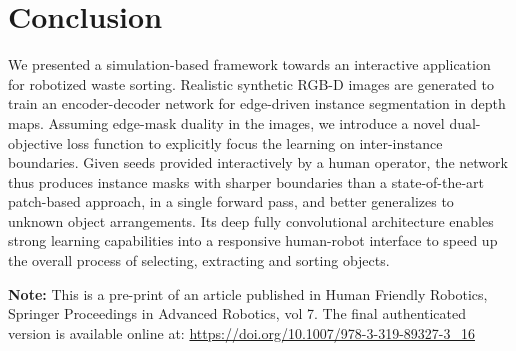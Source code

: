 \documentclass[runningheads,a4paper]{llncs}
\begin{document}
\section{Conclusion}

We presented a simulation-based framework towards an interactive application for robotized waste sorting. Realistic synthetic RGB-D images are generated to train an encoder-decoder network for edge-driven instance segmentation in depth maps. Assuming edge-mask duality in the images, we introduce a novel dual-objective loss function to explicitly focus the learning on inter-instance boundaries. Given seeds provided interactively by a human operator, the network thus produces instance masks with sharper boundaries than a state-of-the-art patch-based approach, in a single forward pass, and better generalizes to unknown object arrangements. Its deep fully convolutional architecture enables strong learning capabilities into a responsive human-robot interface to speed up the overall process of selecting, extracting and sorting objects.

\bigskip

\textbf{Note:} This is a pre-print of an article published in Human Friendly Robotics, Springer Proceedings in Advanced Robotics, vol 7. The final authenticated version is available online at: \url{https://doi.org/10.1007/978-3-319-89327-3_16}





%
%
%
\end{document}
